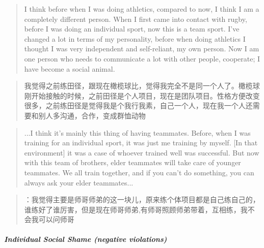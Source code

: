 \begin{CJK}{UTF8}{gbsn}
          \begin{quotation}
            I think before when I was doing athletics, compared to now, I think I am a completely different person.  When I first came into contact with rugby, before I was doing an individual sport, now this is a team sport. I've changed a lot in terms of my personality, before when doing athletics I thought I was very independent and self-reliant, my own person.  Now I am one person who needs to communicate a lot with other people, cooperate; I have become a social animal.
          \end{quotation}


            \begin{quotation}
              我觉得之前练田径，跟现在橄榄球比，觉得我完全不是同一个人了。橄榄球刚开始接触的时候，之前田径是个人项目，现在是团队项目。性格方便改变很多，之前练田径是觉得我是个我行我素，自己一个人，现在我一个人还需要和别人多沟通，合作，变成群恤动物
            \end{quotation}



          \begin{quotation}
            ...I think it's mainly this thing of having teammates. Before, when I was training for an individual sport, it was just me training by myself. [In that environment] it was a case of whoever trained well was successful.  But now with this team of brothers, elder teammates will take care of younger teammates. We all train together, and if you can’t do something, you can always ask your elder teammates...
          \end{quotation}


            \begin{quotation}
              ：我觉得主要是师哥师弟的这一块儿，原来练个体项目都是自己练自己的，谁练好了谁厉害，但是现在师哥师弟,有师哥照顾师弟带着，互相练，我不会我可以问师哥
            \end{quotation}









          \subparagraph{Individual Social Shame (negative violations)}








\end{CJK}
